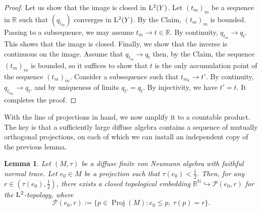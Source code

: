 \documentclass[12pt]{amsart} %
\theoremstyle{plain}
\newtheorem{lemma}[theorem]{Lemma}
\theoremstyle{definition}
\newcommand{\R}{\mathbb{R}}
\newcommand{\N}{\mathbb{N}}
\DeclareMathOperator{\Proj}{Proj}
\begin{document}
\begin{proof}
\noindent Let us show that the image is closed in ${\rm L}^2(Y)$. Let $(t_m)_m$ be a sequence in $\R$ such that $(q_{t_m})$ converges in ${\rm L}^2(Y)$. By the Claim, $(t_m)_m$ is bounded. Passing to a subsequence, we may assume $t_m\to t\in\mathbb R$. By continuity, $q_{t_m}\to q_t$. This shows that the image is closed. Finally, we show that the inverse is continuous on the image. Assume that $q_{t_m}\to q_t$ then, by the Claim, the sequence $(t_m)_m$ is bounded, so it suffices to show that $t$ is the only accumulation point of the sequence $(t_m)_m$. Consider a subsequence such that $t_{m_k}\to t'$. By continuity, $q_{t_{m_k}}\to q_{t'}$ and by uniqueness of limits $q_{t'}=q_t$. By injectivity, we have $t'=t$. It completes the proof.\end{proof}
With the line of projections in hand, we now amplify it to a countable product. The key is that a sufficiently large diffuse algebra contains a sequence of mutually orthogonal projections, on each of which we can install an independent copy of the previous lemma.
\begin{lemma}
\label{LemClosedBaireMarkedProjections}
Let \((M,\tau)\) be a diffuse finite von Neumann algebra with faithful normal trace.
Let \(e_0\in M\) be a projection such that $\tau(e_0)<\frac12$. Then, for any $r\in(\tau(e_0),\frac12)$, there exists a closed topological embedding 
$\R^\N\hookrightarrow \mathcal P(e_0,r)$ for the \({\rm L}^2\)-topology, where
        $$\mathcal P(e_0,r):=
        \{p\in\Proj(M):e_0\leq p,\ \tau(p)=r\}.$$
\end{lemma}
\end{document}
